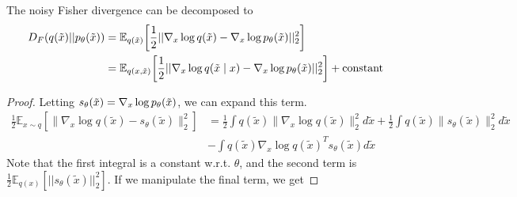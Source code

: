 \documentclass{article}
\begin{document}
    \begin{theorem}
      The noisy Fisher divergence can be decomposed to
      \begin{align}
        D_F (q(\Tilde{x}) || p_\theta(\Tilde{x})) & = \mathbb{E}_{q(\Tilde{x})} \bigg[ \frac{1}{2} || \nabla_x \log q(\Tilde{x}) - \nabla_x \log p_\theta (\Tilde{x})||_2^2 \bigg] \\
                                                  & = \mathbb{E}_{q(x, \Tilde{x})} \bigg[ \frac{1}{2} || \nabla_x \log q(\Tilde{x} \mid x) - \nabla_x \log p_\theta (\Tilde{x})||_2^2 \bigg] + \mathrm{constant}
      \end{align}
    \end{theorem}
    \begin{proof}
      Letting $s_\theta (\Tilde{x}) = \nabla_x \log p_\theta (\Tilde{x})$, we can expand this term. 
      \begin{align}
        \frac{1}{2} \mathbb{E}_{x\sim q}\left[\|\nabla_x \log q(\tilde{x}) - s_\theta(\tilde{x})\|_2^2\right] & = \frac{1}{2}\int q(\tilde{x})\|\nabla_x \log q(\tilde{x})\|_2^2 d\tilde{x} + \frac{1}{2}\int q(\tilde{x})\|s_\theta(\tilde{x})\|_2^2 d\tilde{x} \\ 
                                                                                                     & - \int q(\tilde{x})\nabla_x \log q(\tilde{x})^T s_\theta(\tilde{x}) d\tilde{x}
      \end{align}
      Note that the first integral is a constant w.r.t. $\theta$, and the second term is $\frac{1}{2} \mathbb{E}_{q(x)} [||s_\theta (\tilde{x})||_2^2]$. If we manipulate the final term, we get 


\end{proof}
\end{document}
